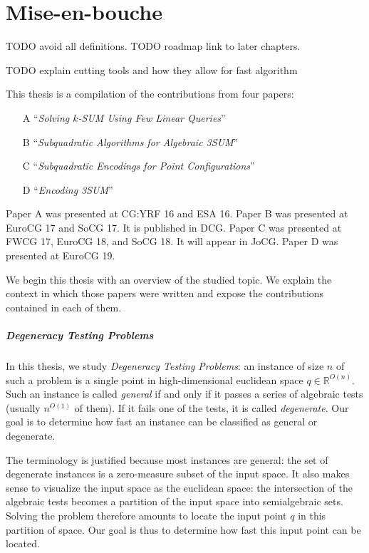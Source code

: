 \chapter{Mise-en-bouche}

TODO avoid all definitions.
TODO roadmap link to later chapters.

TODO explain cutting tools and how they allow for fast algorithm

This thesis is a compilation of the contributions from four papers:
%
\begin{enumerate}
	\item[A] ``\emph{Solving \(k\)-SUM Using Few Linear Queries}''~\cite{CIO16}
	\item[B] ``\emph{Subquadratic Algorithms for Algebraic 3SUM}''~\cite{BCILOS19}
	\item[C] ``\emph{Subquadratic Encodings for Point Configurations}''~\cite{CCILO19}
	\item[D] ``\emph{Encoding 3SUM}''~\cite{CCILMO19}
\end{enumerate}
%
Paper A was presented at CG:YRF 16 and ESA 16.
%
Paper B was presented at EuroCG 17 and SoCG 17. It is published in DCG.
%
Paper C was presented at FWCG 17, EuroCG 18, and SoCG 18. It will appear in JoCG.
%
Paper D was presented at EuroCG 19.

We begin this thesis with an overview of the studied topic.
%
We explain the context in which those papers were written and expose
the contributions contained in each of them.

\paragraph{Degeneracy Testing Problems}
%
In this thesis,
we study \emph{Degeneracy Testing Problems}:
an instance of size \(n\) of such a problem is a single point in
high-dimensional euclidean space \(q \in \mathbb{R}^{O(n)}\). Such an instance
is called \emph{general} if and only if it passes a series of algebraic tests
(usually \(n^{O(1)}\) of them). If it fails one of the tests, it is
called \emph{degenerate}.
%
Our goal is to determine how fast an instance can be classified as general or
degenerate.

The terminology is justified because most instances
are general: the set of degenerate instances is a zero-measure subset of the
input space. It also makes sense to visualize the input space as the euclidean
space: the intersection of the algebraic tests becomes a partition of
the input space into semialgebraic sets. Solving the problem therefore amounts
to locate the input point \(q\) in this partition of space. Our goal
is thus to determine how fast this input point can be located.

